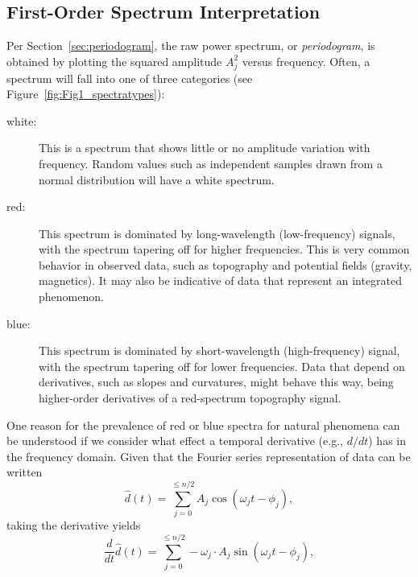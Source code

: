 \subsection{First-Order Spectrum Interpretation}
\label{sec:firstorderspectrum}
Per Section~\ref{sec:periodogram}, the raw power spectrum, or \emph{periodogram}, is obtained by plotting the squared amplitude $A_j^2$ versus
frequency.  Often, a spectrum will fall into one of three categories (see Figure~\ref{fig:Fig1_spectratypes}):
\begin{description}
	\item [white:] This is a spectrum that shows little or no amplitude variation with frequency.  Random values
	such as independent samples drawn from a normal distribution will have a white spectrum.
	\item [red:] This spectrum is dominated by long-wavelength (low-frequency) signals, with the spectrum tapering
	off for higher frequencies.  This is very common behavior in observed data, such as topography and potential fields (gravity, magnetics).
	It may also be indicative of data that represent an integrated phenomenon.
	\item [blue:] This spectrum is dominated by short-wavelength (high-frequency) signal, with the spectrum tapering
	off for lower frequencies.  Data that depend on derivatives, such as slopes and curvatures, might behave this way, being higher-order
	derivatives of a red-spectrum topography signal.
\end{description}
One reason for the prevalence of red or blue spectra for natural phenomena can be understood if we consider what effect a temporal derivative (e.g., $d/dt$) has in the frequency domain.  Given that the Fourier series representation of data can be written
\begin{equation}
\hat{d}(t) = \sum_{j = 0}^{\leq n/2} A_j \cos \left (\omega_j t - \phi_j \right ),
\end{equation}
taking the derivative yields
\begin{equation}
\frac{d}{dt}\hat{d}(t) = \sum_{j = 0}^{\leq n/2} -\omega_j \cdot A_j \sin \left (\omega_j t - \phi_j \right ),
\end{equation}
